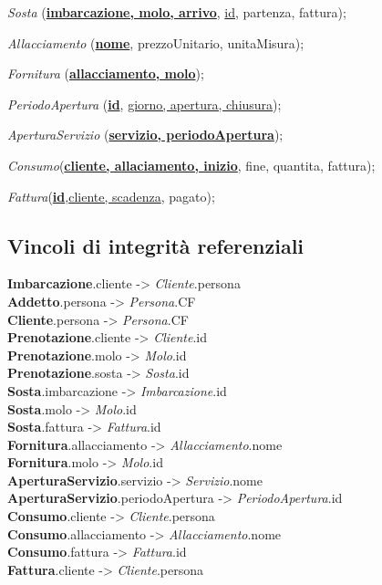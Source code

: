 \textit{Sosta} (\underline{\textbf{imbarcazione, molo, arrivo}}, \underline{id}, partenza, fattura);

\textit{Allacciamento} (\underline{\textbf{nome}}, prezzoUnitario, unitaMisura);

\textit{Fornitura} (\underline{\textbf{allacciamento, molo}});

\textit{PeriodoApertura} (\underline{\textbf{id}}, \underline{giorno, apertura, chiusura});

\textit{AperturaServizio} (\underline{\textbf{servizio, periodoApertura}});

\textit{Consumo}(\underline{\textbf{cliente, allaciamento, inizio}}, fine, quantita, fattura);

\textit{Fattura}(\underline{\textbf{id}},\underline{cliente, scadenza}, pagato);\\

\subsection{Vincoli di integrità referenziali}

\textbf{Imbarcazione}.cliente -> \textit{Cliente}.persona\\
\textbf{Addetto}.persona -> \textit{Persona}.CF\\
\textbf{Cliente}.persona -> \textit{Persona}.CF\\
\textbf{Prenotazione}.cliente -> \textit{Cliente}.id\\
\textbf{Prenotazione}.molo -> \textit{Molo}.id\\
\textbf{Prenotazione}.sosta -> \textit{Sosta}.id\\
\textbf{Sosta}.imbarcazione -> \textit{Imbarcazione}.id\\
\textbf{Sosta}.molo -> \textit{Molo}.id\\
\textbf{Sosta}.fattura -> \textit{Fattura}.id\\
\textbf{Fornitura}.allacciamento -> \textit{Allacciamento}.nome\\
\textbf{Fornitura}.molo -> \textit{Molo}.id\\
\textbf{AperturaServizio}.servizio -> \textit{Servizio}.nome\\
\textbf{AperturaServizio}.periodoApertura -> \textit{PeriodoApertura}.id\\
\textbf{Consumo}.cliente -> \textit{Cliente}.persona\\
\textbf{Consumo}.allacciamento -> \textit{Allacciamento}.nome\\
\textbf{Consumo}.fattura -> \textit{Fattura}.id\\
\textbf{Fattura}.cliente -> \textit{Cliente}.persona\\

